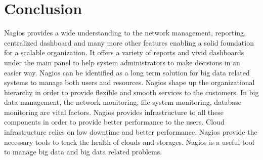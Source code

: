 \documentclass[9pt,twocolumn,twoside]{../../styles/osajnl}
\begin{document}
\section{Conclusion}

Nagios provides a wide understanding to the network management,
reporting, centralized dashboard and many more other features enabling
a solid foundation for a scalable organization. It offers a variety of
reports and vivid dashboards under the main panel to help system
administrators to make decisions in an easier way. Nagios can be
identified as a long term solution for big data related systems to
manage both users and resources.  Nagios shape up the organizational
hierarchy in order to provide flexible and smooth services to the
customers. In big data management, the network monitoring, file system
monitoring, database monitoring are vital factors. Nagios provides
infrastructure to all these components in order to provide better
performance to the users. Cloud infrastructure relies on low downtime
and better performance.  Nagios provide the necessary tools to track
the health of clouds and storages.  Nagios is a useful tool to manage
big data and big data related problems.



 
\end{document}
